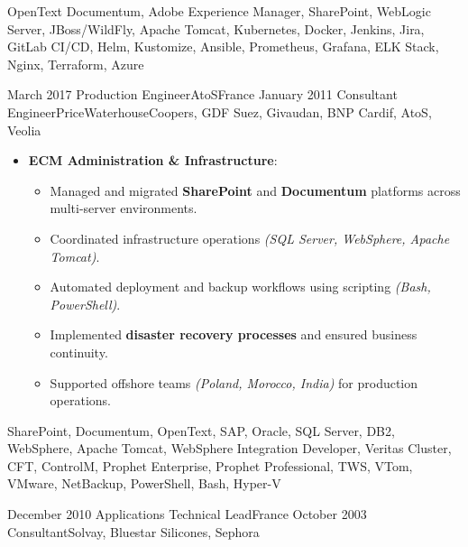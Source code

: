 \begin{experiences}
{\begin{itemize}[left=0pt,label={},itemsep=0.5em]
        \end{itemize}
    }
    {OpenText Documentum, Adobe Experience Manager, SharePoint, WebLogic Server, JBoss/WildFly, Apache Tomcat, Kubernetes, Docker, Jenkins, Jira, GitLab CI/CD, Helm, Kustomize, Ansible, Prometheus, Grafana, ELK Stack, Nginx, Terraform, Azure}

\emptySeparator
\emptySeparator

\consultantexperience
    {March 2017}       {Production Engineer}{AtoS}{France}
    {January 2011}    {Consultant Engineer}{PriceWaterhouseCoopers, GDF Suez, Givaudan, BNP Cardif, AtoS, Veolia} {
        \begin{itemize}[left=0pt,label={},itemsep=0.4em]

          \item \textbf{ECM Administration \& Infrastructure}:
            \begin{itemize}[itemsep=0.15em,topsep=0.1em,parsep=0pt]
              \small
              \item Managed and migrated \textbf{SharePoint} and \textbf{Documentum} platforms across multi-server environments.
              \item Coordinated infrastructure operations \emph{(SQL Server, WebSphere, Apache Tomcat)}.
              \item Automated deployment and backup workflows using scripting \emph{(Bash, PowerShell)}.
              \item Implemented \textbf{disaster recovery processes} and ensured business continuity.
              \item Supported offshore teams \emph{(Poland, Morocco, India)} for production operations.
            \end{itemize}

        \end{itemize}
    }
    {SharePoint, Documentum, OpenText, SAP, Oracle, SQL Server, DB2, WebSphere, Apache Tomcat, WebSphere Integration Developer, Veritas Cluster, CFT, ControlM, Prophet Enterprise, Prophet Professional, TWS, VTom, VMware, NetBackup, PowerShell, Bash, Hyper-V}

\emptySeparator

\consultantexperience
    {December 2010} {Applications Technical Lead}{}{France}
    {October 2003}    {Consultant}{Solvay, Bluestar Silicones, Sephora} {
        \begin{itemize}[left=0pt,label={},itemsep=0.5em]


\end{itemize}}
\end{experiences}
